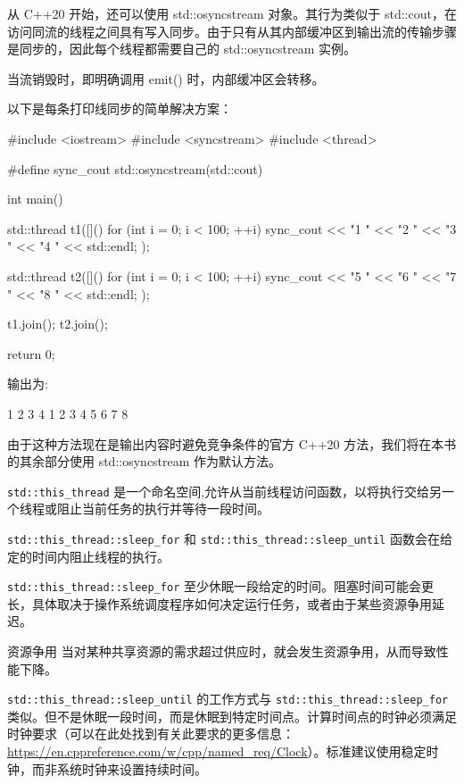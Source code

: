 从 C++20 开始，还可以使用 std::osyncstream 对象。其行为类似于 std::cout，在访问同流的线程之间具有写入同步。由于只有从其内部缓冲区到输出流的传输步骤是同步的，因此每个线程都需要自己的 std::osyncstream 实例。

当流销毁时，即明确调用 emit() 时，内部缓冲区会转移。

以下是每条打印线同步的简单解决方案：

\begin{cpp}
#include <iostream>
#include <syncstream>
#include <thread>

#define sync_cout std::osyncstream(std::cout)

int main() {
    std::thread t1([]() {
        for (int i = 0; i < 100; ++i) {
            sync_cout << "1 " << "2 " << "3 " << "4 "
            << std::endl;
        }
    });

    std::thread t2([]() {
        for (int i = 0; i < 100; ++i) {
            sync_cout << "5 " << "6 " << "7 " << "8 "
            << std::endl;
        }
    });

    t1.join();
    t2.join();

    return 0;
}
\end{cpp}

输出为:

\begin{shell}
1 2 3 4
1 2 3 4
5 6 7 8
\end{shell}

由于这种方法现在是输出内容时避免竞争条件的官方 C++20 方法，我们将在本书的其余部分使用 std::osyncstream 作为默认方法。


\verb|std::this_thread| 是一个命名空间,允许从当前线程访问函数，以将执行交给另一个线程或阻止当前任务的执行并等待一段时间。

\verb|std::this_thread::sleep_for| 和 \verb|std::this_thread::sleep_until| 函数会在给定的时间内阻止线程的执行。

\verb|std::this_thread::sleep_for| 至少休眠一段给定的时间。阻塞时间可能会更长，具体取决于操作系统调度程序如何决定运行任务，或者由于某些资源争用延迟。

\begin{myTip}{资源争用}
当对某种共享资源的需求超过供应时，就会发生资源争用，从而导致性能下降。
\end{myTip}

\verb|std::this_thread::sleep_until| 的工作方式与 \verb|std::this_thread::sleep_for| 类似。但不是休眠一段时间，而是休眠到特定时间点。计算时间点的时钟必须满足时钟要求（可以在此处找到有关此要求的更多信息： \url{https://en.cppreference.com/w/cpp/named_req/Clock}）。标准建议使用稳定时钟，而非系统时钟来设置持续时间。

